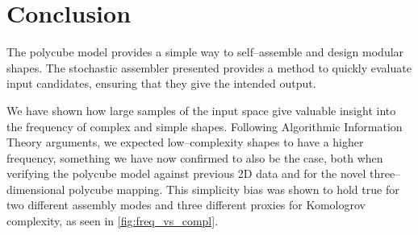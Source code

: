 






\section{Conclusion}
The polycube model provides a simple way to self--assemble and design modular shapes. The stochastic assembler presented provides a method to quickly evaluate input candidates, ensuring that they give the intended output.

We have shown how large samples of the input space give valuable insight into the frequency of complex and simple shapes. Following Algorithmic Information Theory arguments, we expected low--complexity shapes to have a higher frequency, something we have now confirmed to also be the case, both when verifying the polycube model against previous 2D data and for the novel three--dimensional polycube mapping. This simplicity bias was shown to hold true for two different assembly modes and three different proxies for Komologrov complexity, as seen in \ref{fig:freq_vs_compl}.

